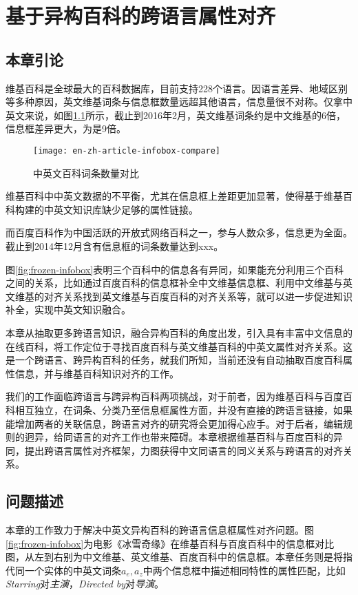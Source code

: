 \chapter{基于异构百科的跨语言属性对齐}
\label{cha:property-matching}

\section{本章引论}
维基百科是全球最大的百科数据库，目前支持228个语言。因语言差异、地域区别等多种原因，英文维基词条与信息框数量远超其他语言，信息量很不对称。仅拿中英文来说，如图\ref{fig:en-zh-article-infobox-compare}所示，截止到2016年2月，英文维基词条约是中文维基的6倍，信息框差异更大，为是9倍。

\begin{figure}[h]
  \centering
  \texttt{[image: en-zh-article-infobox-compare]}
  \caption{中英文百科词条数量对比}
  \label{fig:en-zh-article-infobox-compare}
\end{figure}

维基百科中中英文数据的不平衡，尤其在信息框上差距更加显著，使得基于维基百科构建的中英文知识库缺少足够的属性链接。

而百度百科作为中国活跃的开放式网络百科之一，参与人数众多，信息更为全面。截止到2014年12月含有信息框的词条数量达到xxx。

图\ref{fig:frozen-infobox}表明三个百科中的信息各有异同，如果能充分利用三个百科之间的关系，比如通过百度百科的信息框补全中文维基信息框、利用中文维基与英文维基的对齐关系找到英文维基与百度百科的对齐关系等，就可以进一步促进知识补全，实现中英文知识融合。

本章从抽取更多跨语言知识，融合异构百科的角度出发，引入具有丰富中文信息的在线百科，将工作定位于寻找百度百科与英文维基百科的中英文属性对齐关系。这是一个跨语言、跨异构百科的任务，就我们所知，当前还没有自动抽取百度百科属性信息，并与维基百科知识对齐的工作。

我们的工作面临跨语言与跨异构百科两项挑战，对于前者，因为维基百科与百度百科相互独立，在词条、分类乃至信息框属性方面，并没有直接的跨语言链接，如果能增加两者的关联信息，跨语言对齐的研究将会更加得心应手。对于后者，编辑规则的迥异，给同语言的对齐工作也带来障碍。本章根据维基百科与百度百科的异同，提出跨语言属性对齐框架，力图获得中文同语言的同义关系与跨语言的对齐关系。


\section{问题描述}
本章的工作致力于解决中英文异构百科的跨语言信息框属性对齐问题。图\ref{fig:frozen-infobox}为电影《冰雪奇缘》在维基百科与百度百科中的信息框对比图，从左到右别为中文维基、英文维基、百度百科中的信息框。本章任务则是将指代同一个实体的中英文词条$a_e,a_z$中两个信息框中描述相同特性的属性匹配，比如\textit{Starring}对\textit{主演}，\textit{Directed by}对\textit{导演}。

